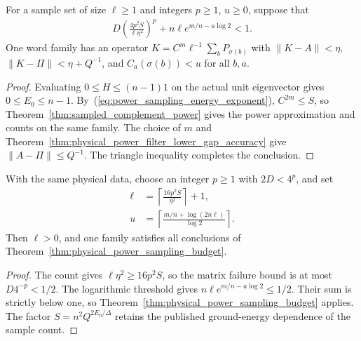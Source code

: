 \begin{theorem}
    \label{thm:physical_power_sampling_budget}
    \leanok
    For a sample set of size $\ell\ge1$ and integers $p\ge1$, $u\ge0$,
    suppose that
    \begin{align}
        D\left(\frac{4p^2S}{\ell\eta^2}\right)^p
        +n\ell e^{m/n-u\log2}<1.
        \label{eq:physical_power_sampling_budget}
    \end{align}
    One word family has an operator $K=C^m\ell^{-1}\sum_bP_{\sigma(b)}$ with
    $\|K-A\|<\eta$, $\|K-\Pi\|<\eta+Q^{-1}$, and
    $C_a(\sigma(b))<u$ for all $b,a$.
\end{theorem}
\begin{proof}\leanok
    Evaluating $0\le H\le(n-1)1$ on the actual unit eigenvector gives
    $0\le E_0\le n-1$. By~(\ref{eq:power_sampling_energy_exponent}),
    $C^{2m}\le S$, so Theorem~\ref{thm:sampled_complement_power} gives the
    power approximation and counts on the same family.
    The choice of $m$ and
    Theorem~\ref{thm:physical_power_filter_lower_gap_accuracy} give
    $\|A-\Pi\|\le Q^{-1}$. The triangle inequality completes the conclusion.
\end{proof}

\begin{theorem}
    \label{thm:physical_power_sampling_explicit_count}
    \leanok
    With the same physical data, choose an integer $p\ge1$ with $2D<4^p$,
    and set
    \begin{align}
        \ell & =\left\lceil\frac{16p^2S}{\eta^2}\right\rceil+1,        \\
        u    & =\left\lceil\frac{m/n+\log(2n\ell)}{\log2}\right\rceil.
        \label{eq:physical_power_sampling_explicit_count}
    \end{align}
    Then $\ell>0$, and one family satisfies all conclusions of
    Theorem~\ref{thm:physical_power_sampling_budget}.
\end{theorem}
\begin{proof}\leanok
    The count gives $\ell\eta^2\ge16p^2S$, so the matrix failure bound is
    at most $D4^{-p}<1/2$. The logarithmic threshold gives
    $n\ell e^{m/n-u\log2}\le1/2$.
    Their sum is strictly below one, so
    Theorem~\ref{thm:physical_power_sampling_budget} applies.
    The factor $S=n^2Q^{2E_0/\Delta}$ retains the published ground-energy
    dependence of the sample count.
\end{proof}

